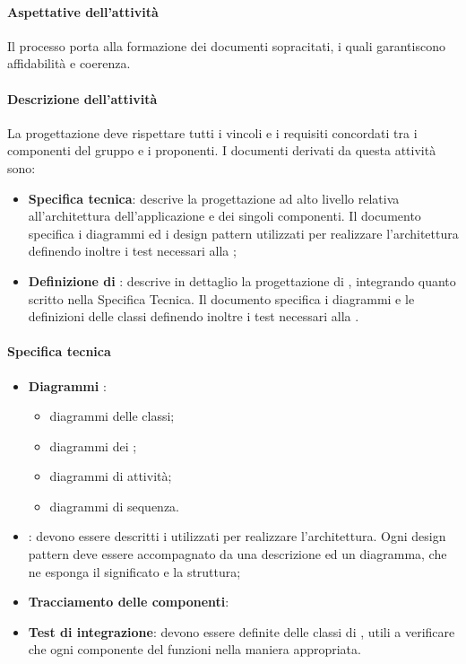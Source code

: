  \paragraph{Aspettative dell'attività}
Il processo porta alla formazione dei documenti sopracitati, i quali garantiscono affidabilità e
coerenza.
 \paragraph{Descrizione dell'attività}
La progettazione deve rispettare tutti i vincoli e i requisiti concordati tra i componenti del gruppo
e i proponenti. I documenti derivati da questa attività sono:
\begin{itemize}
	\item \textbf{Specifica tecnica}: descrive la progettazione ad alto livello relativa all'architettura dell'applicazione
e dei singoli componenti. Il documento specifica i diagrammi  ed i design
pattern utilizzati per realizzare l'architettura definendo inoltre i test necessari alla ;
	\item \textbf{Definizione di }: descrive in dettaglio la progettazione di , integrando
quanto scritto nella Specifica Tecnica. Il documento specifica i diagrammi  e le
definizioni delle classi definendo inoltre i test necessari alla .
\end{itemize}
 \paragraph{Specifica tecnica}
\begin{itemize} 
	\item \textbf{Diagrammi }:
	\begin{itemize}
	\item diagrammi delle classi;
	\item diagrammi dei ;
	\item diagrammi di attività;
	\item diagrammi di sequenza.
	\end{itemize}
	\item \textbf{}: devono essere descritti i  utilizzati per realizzare l'architettura. Ogni design
pattern deve essere accompagnato da una descrizione ed un diagramma, che ne esponga il
significato e la struttura;
	\item \textbf{Tracciamento delle componenti}:
	\item \textbf{Test di integrazione}: devono essere definite delle classi di , utili a verificare che ogni componente del
 funzioni nella maniera appropriata.
\end{itemize}
